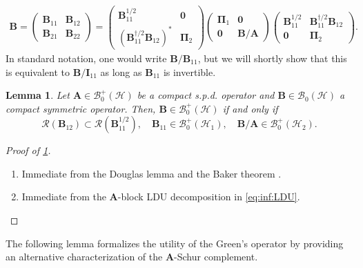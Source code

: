 \documentclass[noinfoline]{imsart}\setcounter{tocdepth}{2}
\newcommand{\m}[1]{\mathbf{#1}} %
\renewcommand{\c}[1]{\mathcal{#1}} %
\theoremstyle{plain}
\newtheorem{lemma}[theorem]{Lemma}
\begin{document}
\begin{align}\label{eq:inf:LDU}
    \m{B} = \begin{pmatrix}
        \m{B}_{11} & \m{B}_{12} \\
        \m{B}_{21} & \m{B}_{22}
    \end{pmatrix} = \begin{pmatrix}
        \m{B}_{11}^{1/2} & \m{0} \\
        (\m{B}_{11}^{\dagger/2} \m{B}_{12})^{*} & \m{\Pi}_{2}
    \end{pmatrix}
    \begin{pmatrix}
        \m{\Pi}_{1} & \m{0} \\
        \m{0} & \m{B}/\m{A}
    \end{pmatrix} \begin{pmatrix}
        \m{B}_{11}^{1/2} & \m{B}_{11}^{\dagger/2} \m{B}_{12}  \\
        \m{0} & \m{\Pi}_{2}
    \end{pmatrix}.
\end{align}
In standard notation, one would write $\m{B} / \m{B}_{11}$, but we will shortly show that this is equivalent to $\m{B} / \m{I}_{11}$ as long as $\m{B}_{11}$ is invertible.

\begin{lemma}\label{lem:Schur:spd}
Let $\m{A} \in \c{B}_{0}^{+}(\c{H})$ be a compact s.p.d. operator and $\m{B} \in \c{B}_{0}(\c{H})$ a compact symmetric operator. Then, $\m{B} \in \c{B}_{0}^{+}(\c{H})$ if and only if
\begin{equation*} 
    \c{R}(\m{B}_{12}) \subset \c{R}(\m{B}_{11}^{1/2}), \quad \m{B}_{11} \in \c{B}_{0}^{+}(\c{H}_{1}), \quad \m{B} / \m{A} \in \c{B}_{0}^{+}(\c{H}_{2}).
\end{equation*}
\end{lemma}
\begin{proof}[Proof of \cref{lem:Schur:spd}]
\begin{enumerate}
    \item [($\Rightarrow$)] Immediate from the Douglas lemma \cite{douglas1966majorization} and the Baker theorem \cite{baker1970mutual, hsing2015theoretical}.
    \item [($\Leftarrow$)] Immediate from the $\m{A}$-block LDU decomposition in \eqref{eq:inf:LDU}.
\end{enumerate}
\end{proof}



The following lemma formalizes the utility of the Green's operator by providing an alternative characterization of the $\m{A}$-Schur complement.
\end{document}
